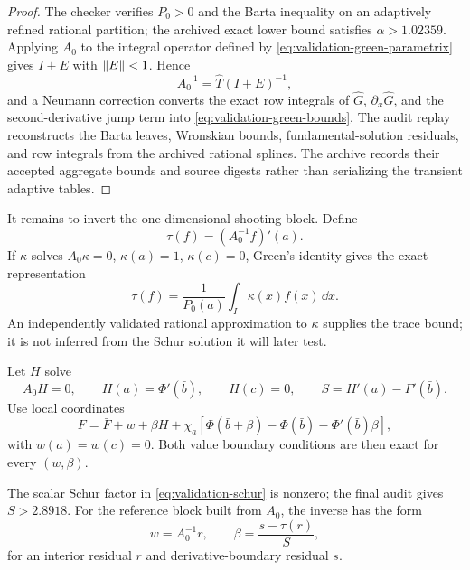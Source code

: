 \begin{proof}
The checker verifies $P_0>0$ and the Barta inequality on an adaptively refined
rational partition; the archived exact lower bound satisfies
$\alpha>1.02359$.  Applying $A_0$ to the integral operator defined by
\eqref{eq:validation-green-parametrix} gives $I+E$ with
$\left\lVert E\right\rVert<1$.  Hence
\[
 A_0^{-1}=\widehat T(I+E)^{-1},
\]
and a Neumann correction converts the exact row integrals of $\widehat G$,
$\partial_x\widehat G$, and the second-derivative jump term into
\eqref{eq:validation-green-bounds}.  The audit replay reconstructs the Barta
leaves, Wronskian bounds, fundamental-solution residuals, and row integrals
from the archived rational splines.  The archive records their accepted
aggregate bounds and source digests rather than serializing the transient
adaptive tables.
\end{proof}

It remains to invert the one-dimensional shooting block.  Define
\[
 \tau(f)=(A_0^{-1}f)'(a).
\]
If $\kappa$ solves $A_0\kappa=0$, $\kappa(a)=1$, $\kappa(c)=0$, Green's
identity gives the exact representation
\begin{equation}
 \tau(f)=\frac1{P_0(a)}\int_I\kappa(x)f(x)\,\dd x.
 \label{eq:validation-trace-representer}
\end{equation}
An independently validated rational approximation to $\kappa$ supplies the
trace bound; it is not inferred from the Schur solution it will later test.

Let $H$ solve
\begin{equation}
 A_0H=0,\qquad H(a)=\Phi'(\bar b),\qquad H(c)=0,\qquad
 S=H'(a)-\Gamma'(\bar b).
 \label{eq:validation-schur}
\end{equation}
Use local coordinates
\begin{equation}
 F=\bar F+w+\beta H
 +\chi_a\left[\Phi(\bar b+\beta)-\Phi(\bar b)-\Phi'(\bar b)\beta\right],
 \label{eq:validation-augmented-chart}
\end{equation}
with $w(a)=w(c)=0$.  Both value boundary conditions are then exact for every
$(w,\beta)$.

\begin{lemma}
\label{lem:validation-schur-inverse}
The scalar Schur factor in \eqref{eq:validation-schur} is nonzero; the final
audit gives $S>2.8918$.  For the reference block built from $A_0$, the inverse
has the form
\begin{equation}
 w=A_0^{-1}r,\qquad
 \beta=\frac{s-\tau(r)}{S},
 \label{eq:validation-block-inverse}
\end{equation}
for an interior residual $r$ and derivative-boundary residual $s$.
\end{lemma}

